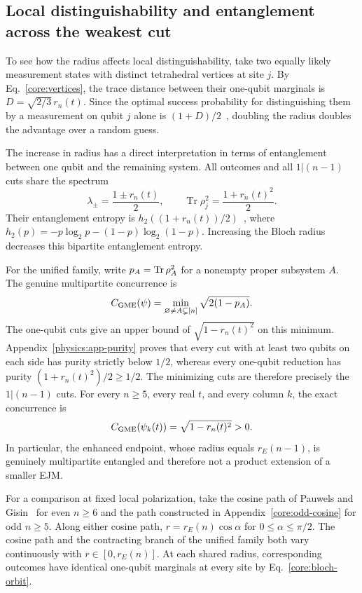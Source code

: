 \subsection{Local distinguishability and entanglement across the weakest cut}
\label{physics:entanglement}

To see how the radius affects local distinguishability, take two equally likely measurement states with distinct tetrahedral vertices at site $j$. By Eq.~\eqref{core:vertices}, the trace distance between their one-qubit marginals is $D=\sqrt{2/3}\,r_n(t)$. Since the optimal success probability for distinguishing them by a measurement on qubit $j$ alone is $(1+D)/2$~\cite{Helstrom1967}, doubling the radius doubles the advantage over a random guess.

The increase in radius has a direct interpretation in terms of entanglement between one qubit and the remaining system. All outcomes and all $1|(n-1)$ cuts share the spectrum
\begin{equation}
 \lambda_\pm=\frac{1\pm r_n(t)}2,
 \qquad \operatorname{Tr}\rho_j^2=\frac{1+r_n(t)^2}{2}.
 \label{core:spectrum}
\end{equation}
Their entanglement entropy is $h_2((1+r_n(t))/2)$~\cite{PauwelsGisin2026}, where $h_2(p)=-p\log_2p-(1-p)\log_2(1-p)$. Increasing the Bloch radius decreases this bipartite entanglement entropy.

For the unified family, write $p_A=\operatorname{Tr}\rho_A^2$ for a nonempty proper subsystem $A$. The genuine multipartite concurrence is~\cite{Ma2011}
\begin{equation}
 C_{\rm GME}(\psi)=\min_{\varnothing\ne A\subsetneq[n]}
 \sqrt{2(1-p_A)}.
 \label{physics:gme}
\end{equation}
The one-qubit cuts give an upper bound of $\sqrt{1-r_n(t)^2}$ on this minimum. Appendix~\ref{physics:app-purity} proves that every cut with at least two qubits on each side has purity strictly below $1/2$, whereas every one-qubit reduction has purity $(1+r_n(t)^2)/2\ge1/2$. The minimizing cuts are therefore precisely the $1|(n-1)$ cuts. For every $n\ge5$, every real $t$, and every column $k$, the exact concurrence is
\begin{equation}
 C_{\rm GME}(\psi_k(t))=\sqrt{1-r_n(t)^2}>0.
 \label{physics:gme-law}
\end{equation}
In particular, the enhanced endpoint, whose radius equals $r_E(n-1)$, is genuinely multipartite entangled and therefore not a product extension of a smaller EJM.

For a comparison at fixed local polarization, take the cosine path of Pauwels and Gisin~\cite{PauwelsGisin2026} for even $n\ge6$ and the path constructed in Appendix~\ref{core:odd-cosine} for odd $n\ge5$. Along either cosine path, $r=r_E(n)\cos\alpha$ for $0\le\alpha\le\pi/2$. The cosine path and the contracting branch of the unified family both vary continuously with $r\in[0,r_E(n)]$. At each shared radius, corresponding outcomes have identical one-qubit marginals at every site by Eq.~\eqref{core:bloch-orbit}.

